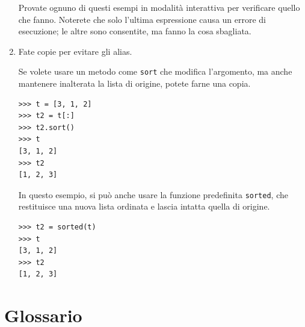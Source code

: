 \documentclass[10pt]{book}
\begin{document}
\begin{enumerate}
Provate ognuno di questi esempi in modalità interattiva per verificare quello che fanno. Noterete che solo l'ultima espressione causa un errore di esecuzione; le altre sono consentite, ma fanno la cosa sbagliata.


\item Fate copie per evitare gli alias.

Se volete usare un metodo come {\tt sort} che modifica l'argomento, ma anche mantenere inalterata la lista di origine, potete farne una copia.

\begin{verbatim}
>>> t = [3, 1, 2]
>>> t2 = t[:]
>>> t2.sort()
>>> t
[3, 1, 2]
>>> t2
[1, 2, 3]
\end{verbatim}

In questo esempio, si può anche usare la funzione predefinita {\tt sorted},
che restituisce una nuova lista ordinata e lascia intatta quella di origine.

\begin{verbatim}
>>> t2 = sorted(t)
>>> t
[3, 1, 2]
>>> t2
[1, 2, 3]
\end{verbatim}

\end{enumerate}


\section{Glossario}
\end{document}
